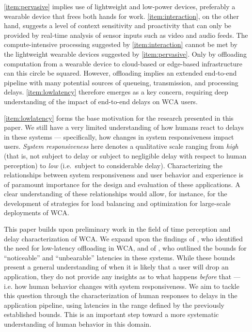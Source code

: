 \documentclass[10pt,letterpaper]{article}
\begin{document}
\cref{item:pervasive} implies use of lightweight and low-power devices, preferably a wearable device that frees both hands for work.
\cref{item:interaction}, on the other hand, suggests a level of context sensitivity and proactivity that can only be provided by real-time analysis of sensor inputs such as video and audio feeds.
The compute-intensive processing suggested by \cref{item:interaction} cannot be met by the lightweight wearable devices suggested by \cref{item:pervasive}.
Only by offloading computation from a wearable device to cloud-based or edge-based infrastructure can this circle be squared.
However, offloading implies an extended end-to-end pipeline with many potential sources of queueing, transmission, and processing delays.
\cref{item:lowlatency} therefore emerges as a key concern, requiring deep understanding of the impact of end-to-end delays on WCA users.

\cref{item:lowlatency} forms the base motivation for the research presented in this paper.
We still have a very limited understanding of how humans react to delays in these systems --- specifically, how changes in system responsiveness impact users.
\emph{System responsiveness} here denotes a qualitative scale ranging from \emph{high} (that is, not subject to delay or subject to negligible delay with respect to human perception) to \emph{low} (i.e.\ subject to considerable delay).
Characterizing the relationships between system responsiveness and user behavior and experience is of paramount importance for the design and evaluation of these applications.
A clear understanding of these relationships would allow, for instance, for the development of strategies for load balancing and optimization for large-scale deployments of WCA.\@

This paper builds upon preliminary work in the field of time perception and delay characterization of WCA.\@
We expand upon the findings of \textcite{Ha:TowardsWearableCogAssist}, who identified the need for low-latency offloading in WCA, and of \textcite{Chen:AnEmpiricalStudyOfLatency}, who outlined the bounds for ``noticeable'' and ``unbearable'' latencies in these systems.
While these bounds present a general understanding of when it is likely that a user will drop an application, they do not provide any insights as to what happens \emph{before} that --- i.e. how human behavior changes with system responsiveness.
We aim to tackle this question through the characterization of human responses to delays in the application pipeline, using latencies in the range defined by the previously established bounds.
This is an important step toward a more systematic understanding of human behavior in this domain.
\end{document}
